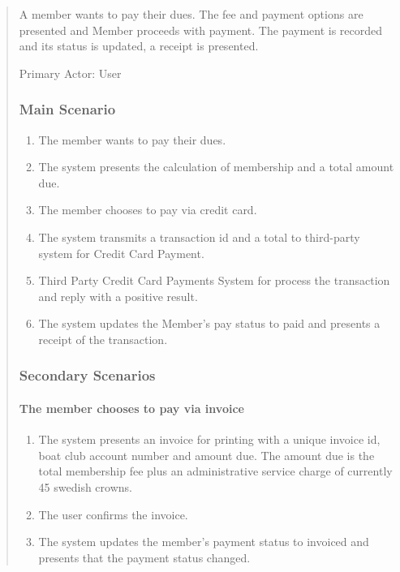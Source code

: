 \begin{quote}
\begin{enumerate}
  A member wants to pay their dues. The fee and payment options are presented
  and Member proceeds with payment. The payment is recorded and its status is
  updated, a receipt is presented.
  
  Primary Actor: User
  
  \subsubsection*{Main Scenario}
  
  \begin{enumerate}
    \tightlist
    \item
      The member wants to pay their dues.
    \item
      The system presents the calculation of membership and a total amount due.
    \item
      The member chooses to pay via credit card.
    \item
      The system transmits a transaction id and a total to third-party system
      for Credit Card Payment.
    \item
      Third Party Credit Card Payments System for process the transaction and
      reply with a positive result.
    \item
      The system updates the Member's pay status to paid and presents a receipt
      of the transaction.
  \end{enumerate}
  
  \subsubsection*{Secondary Scenarios}
  \paragraph{The member chooses to pay via invoice}
  \begin{enumerate}
    \tightlist
    \item
      The system presents an invoice for printing with a unique invoice id,
      boat club account number and amount due. The amount due is the total
      membership fee plus an administrative service charge of currently 45
      swedish crowns.
    \item
      The user confirms the invoice.
    \item
      The system updates the member's payment status to invoiced and presents
      that the payment status changed.
  \end{enumerate}
  

\end{enumerate}
\end{quote}
